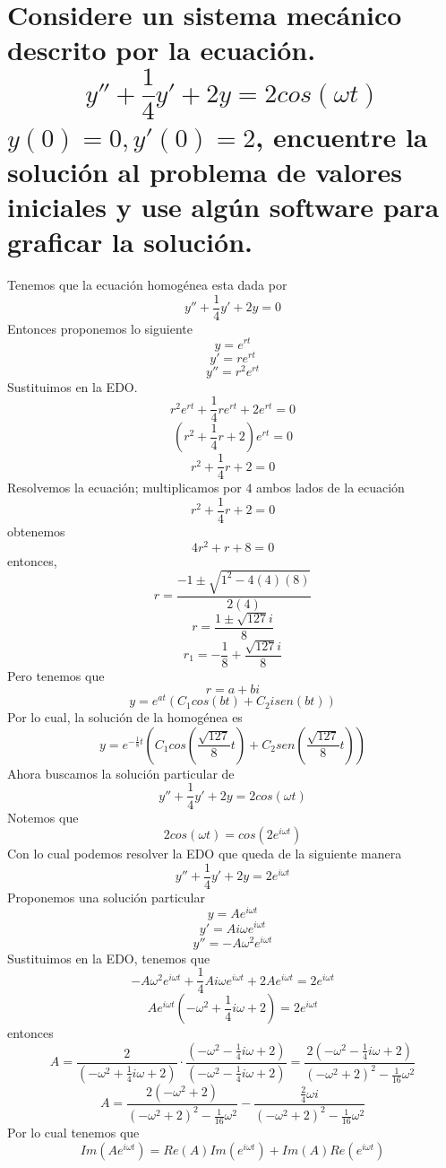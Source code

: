 \section{Considere un sistema mecánico descrito por la ecuación.
\begin{equation*}
y''+\frac{1}{4}y'+2y=2cos(\omega t)
\end{equation*}
$y(0)=0, y'(0)=2$, encuentre la solución al problema de valores iniciales y use algún software para graficar la solución.}

Tenemos que la ecuación homogénea esta dada por
\begin{equation*}
y''+\frac{1}{4}y'+2y=0
\end{equation*}
Entonces proponemos lo siguiente
$$y=e^{rt}$$
$$y'=re^{rt}$$
$$y''=r^2e^{rt}$$
Sustituimos en la EDO.
$$r^2e^{rt}+\frac{1}{4}re^{rt}+2e^{rt}=0$$
$$(r^2+\frac{1}{4}r+2)e^{rt}=0$$
$$r^2+\frac{1}{4}r+2=0$$
Resolvemos la ecuación; multiplicamos por $4$ ambos lados de la ecuación $$r^2+\frac{1}{4}r+2=0$$ obtenemos $$4r^2+r+8=0$$ entonces,
$$r=\frac{-1 \pm \sqrt{1^{2}- 4(4)(8)}} {2(4)}$$
$$r=\frac{1 \pm \sqrt{127}i}{8}$$
$$r_{1}=- \frac{1}{8}+ \frac{\sqrt{127}i}{8}$$
Pero tenemos que
$$r=a+bi$$
$$y=e^{at}(C_1cos(bt)+C_2isen(bt))$$
Por lo cual, la solución de la homogénea es
$$y=e^{-\frac{1}{8}t}(C_{1}cos(\frac{\sqrt{127}}{8}t)+C_{2}sen(\frac{\sqrt{127}}{8}t))$$
Ahora buscamos la solución particular de
\begin{equation*}
y''+\frac{1}{4}y'+2y=2cos(\omega t)
\end{equation*}
Notemos que
$$2cos(\omega t)=cos(2e^{i \omega t})$$
Con lo cual podemos resolver la EDO que queda de la siguiente manera
\begin{equation*}
y''+\frac{1}{4}y'+2y=2e^{i \omega t}
\end{equation*}
Proponemos una solución particular
$$y=Ae^{i \omega t}$$
$$y'=Ai \omega e^{i \omega t}$$
$$y''=-A \omega^2 e^{i \omega t}$$
Sustituimos en la EDO, tenemos que
$$-A \omega^2 e^{i \omega t}+\frac{1}{4}Ai \omega e^{i \omega t}+2Ae^{i \omega t}=2e^{i \omega t}$$
$$Ae^{i \omega t}(-\omega^2+\frac{1}{4}i\omega+2)=2e^{i \omega t}$$
entonces
$$A= \frac{2}{(-\omega^2+\frac{1}{4}i\omega+2)} \cdotp \frac{(-\omega^2-\frac{1}{4}i\omega+2)}{(-\omega^2-\frac{1}{4}i\omega+2)}=\frac{2(-\omega^2-\frac{1}{4}i\omega+2)}{(-\omega^2+2)^2-\frac{1}{16}\omega^2}$$
$$A=\frac{2(-\omega^2+2)}{(-\omega^2+2)^2-\frac{1}{16}\omega^2}-\frac{\frac{2}{4}\omega i}{(-\omega^2+2)^2-\frac{1}{16}\omega^2}$$
Por lo cual tenemos que
$$Im(Ae^{i\omega t})=Re(A)Im(e^{i\omega t})+Im(A)Re(e^{i\omega t})$$
